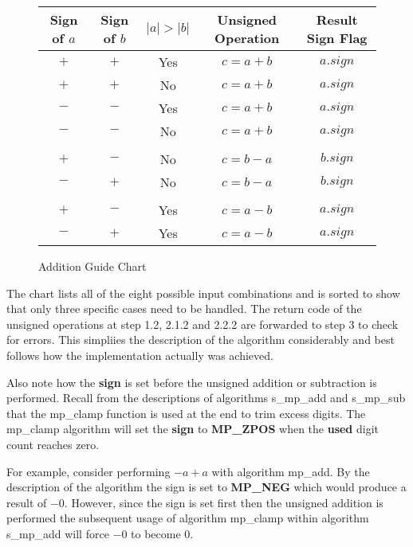 \documentclass[b5paper]{book}
\begin{document}
\begin{figure}[!here]
\begin{small}
\begin{center}
\begin{tabular}{|c|c|c|c|c|}
\hline \textbf{Sign of $a$} & \textbf{Sign of $b$} & \textbf{$\vert a \vert > \vert b \vert $} & \textbf{Unsigned Operation} & \textbf{Result Sign Flag} \\
\hline $+$ & $+$ & Yes & $c = a + b$ & $a.sign$ \\
\hline $+$ & $+$ & No  & $c = a + b$ & $a.sign$ \\
\hline $-$ & $-$ & Yes & $c = a + b$ & $a.sign$ \\
\hline $-$ & $-$ & No  & $c = a + b$ & $a.sign$ \\
\hline &&&&\\

\hline $+$ & $-$ & No  & $c = b - a$ & $b.sign$ \\
\hline $-$ & $+$ & No  & $c = b - a$ & $b.sign$ \\

\hline &&&&\\

\hline $+$ & $-$ & Yes & $c = a - b$ & $a.sign$ \\
\hline $-$ & $+$ & Yes & $c = a - b$ & $a.sign$ \\

\hline
\end{tabular}
\end{center}
\end{small}
\caption{Addition Guide Chart}
\end{figure}

The chart lists all of the eight possible input combinations and is sorted to show that only three specific cases need to be handled.  The 
return code of the unsigned operations at step 1.2, 2.1.2 and 2.2.2 are forwarded to step 3 to check for errors.  This simpliies the description
of the algorithm considerably and best follows how the implementation actually was achieved.

Also note how the \textbf{sign} is set before the unsigned addition or subtraction is performed.  Recall from the descriptions of algorithms
s\_mp\_add and s\_mp\_sub that the mp\_clamp function is used at the end to trim excess digits.  The mp\_clamp algorithm will set the \textbf{sign}
to \textbf{MP\_ZPOS} when the \textbf{used} digit count reaches zero.  

For example, consider performing $-a + a$ with algorithm mp\_add.  By the description of the algorithm the sign is set to \textbf{MP\_NEG} which would
produce a result of $-0$.  However, since the sign is set first then the unsigned addition is performed the subsequent usage of algorithm mp\_clamp 
within algorithm s\_mp\_add will force $-0$ to become $0$.  
\end{document}
